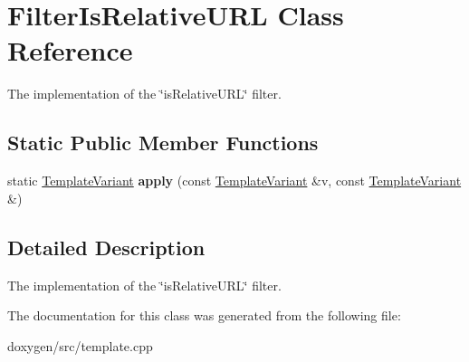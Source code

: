 \hypertarget{class_filter_is_relative_u_r_l}{}\section{Filter\+Is\+Relative\+U\+RL Class Reference}
\label{class_filter_is_relative_u_r_l}


The implementation of the \char`\"{}is\+Relative\+U\+R\+L\char`\"{} filter.  


\subsection*{Static Public Member Functions}
\begin{DoxyCompactItemize}
\item 
\mbox{\label{class_filter_is_relative_u_r_l_a66694de67f60ddfed0ba6175201eaa40}} 
static \mbox{\hyperlink{class_template_variant}{Template\+Variant}} {\bfseries apply} (const \mbox{\hyperlink{class_template_variant}{Template\+Variant}} \&v, const \mbox{\hyperlink{class_template_variant}{Template\+Variant}} \&)
\end{DoxyCompactItemize}


\subsection{Detailed Description}
The implementation of the \char`\"{}is\+Relative\+U\+R\+L\char`\"{} filter. 

The documentation for this class was generated from the following file\+:\begin{DoxyCompactItemize}
\item 
doxygen/src/template.\+cpp\end{DoxyCompactItemize}
